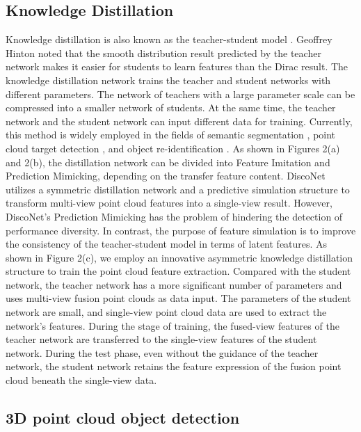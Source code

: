 \documentclass[lettersize,journal]{IEEEtran}
\begin{document}
\subsection{Knowledge Distillation}
Knowledge distillation is also known as the teacher-student model \cite{3}\cite{4}\cite{5}. Geoffrey Hinton \cite{4} noted that the smooth distribution result predicted by the teacher network makes it easier for students to learn features than the Dirac result. The knowledge distillation network trains the teacher and student networks with different parameters. The network of teachers with a large parameter scale can be compressed into a smaller network of students. At the same time, the teacher network and the student network can input different data for training. Currently, this method is widely employed in the fields of semantic segmentation \cite{10}, point cloud target detection \cite{11}, and object re-identification \cite{12}. As shown in Figures 2(a) and 2(b), the distillation network can be divided into Feature Imitation and Prediction Mimicking, depending on the transfer feature content. DiscoNet \cite{13} utilizes a symmetric distillation network and a predictive simulation structure to transform multi-view point cloud features into a single-view result. However, DiscoNet's Prediction Mimicking has the problem of hindering the detection of performance diversity. In contrast, the purpose of feature simulation is to improve the consistency of the teacher-student model in terms of latent features. As shown in Figure 2(c), we employ an innovative asymmetric knowledge distillation structure to train the point cloud feature extraction. Compared with the student network, the teacher network has a more significant number of parameters and uses multi-view fusion point clouds as data input. The parameters of the student network are small, and single-view point cloud data are used to extract the network's features. During the stage of training, the fused-view features of the teacher network are transferred to the single-view features of the student network. During the test phase, even without the guidance of the teacher network, the student network retains the feature expression of the fusion point cloud beneath the single-view data.

\subsection{3D point cloud object detection}
\end{document}
